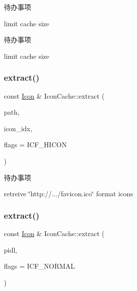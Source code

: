 \begin{DoxyRefDesc}{待办事项}
\item[\hyperlink{todo__todo000018}{待办事项}]limit cache size \end{DoxyRefDesc}


\begin{DoxyRefDesc}{待办事项}
\item[\hyperlink{todo__todo000019}{待办事项}]limit cache size \end{DoxyRefDesc}
\mbox{\label{struct_icon_cache_a62b18f8a6dc71ed7632c22879728f472}} 
\subsubsection{\texorpdfstring{extract()}{extract()}\hspace{0.1cm}{\footnotesize\ttfamily [2/3]}}
{\footnotesize\ttfamily const \hyperlink{struct_icon}{Icon} \& Icon\+Cache\+::extract (\begin{DoxyParamCaption}\item[{L\+P\+C\+T\+S\+TR}]{path,  }\item[{int}]{icon\+\_\+idx,  }\item[{I\+C\+O\+N\+C\+A\+C\+H\+E\+\_\+\+F\+L\+A\+GS}]{flags = {\ttfamily ICF\+\_\+HICON} }\end{DoxyParamCaption})}

\begin{DoxyRefDesc}{待办事项}
\item[\hyperlink{todo__todo000020}{待办事项}]retreive \char`\"{}http\+://.../favicon.\+ico\char`\"{} format icons \end{DoxyRefDesc}
\mbox{\label{struct_icon_cache_a0f47a9cd0630185ccef96fddcdb40083}} 
\subsubsection{\texorpdfstring{extract()}{extract()}\hspace{0.1cm}{\footnotesize\ttfamily [3/3]}}
{\footnotesize\ttfamily const \hyperlink{struct_icon}{Icon} \& Icon\+Cache\+::extract (\begin{DoxyParamCaption}\item[{L\+P\+C\+I\+T\+E\+M\+I\+D\+L\+I\+ST}]{pidl,  }\item[{I\+C\+O\+N\+C\+A\+C\+H\+E\+\_\+\+F\+L\+A\+GS}]{flags = {\ttfamily ICF\+\_\+NORMAL} }\end{DoxyParamCaption})}

